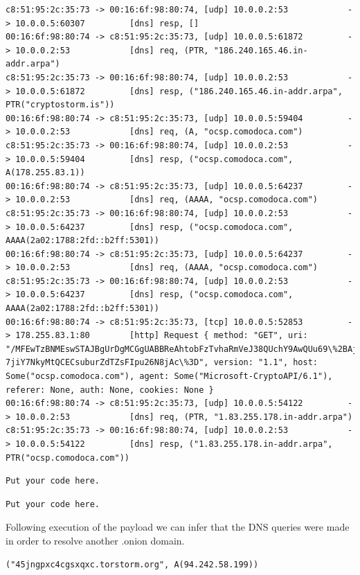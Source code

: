 \documentclass[11pt]{diazessay} %
\begin{document}
\begin{lstlisting}
c8:51:95:2c:35:73 -> 00:16:6f:98:80:74, [udp] 10.0.0.2:53            -> 10.0.0.5:60307         [dns] resp, []
00:16:6f:98:80:74 -> c8:51:95:2c:35:73, [udp] 10.0.0.5:61872         -> 10.0.0.2:53            [dns] req, (PTR, "186.240.165.46.in-addr.arpa")
c8:51:95:2c:35:73 -> 00:16:6f:98:80:74, [udp] 10.0.0.2:53            -> 10.0.0.5:61872         [dns] resp, ("186.240.165.46.in-addr.arpa", PTR("cryptostorm.is"))
00:16:6f:98:80:74 -> c8:51:95:2c:35:73, [udp] 10.0.0.5:59404         -> 10.0.0.2:53            [dns] req, (A, "ocsp.comodoca.com")
c8:51:95:2c:35:73 -> 00:16:6f:98:80:74, [udp] 10.0.0.2:53            -> 10.0.0.5:59404         [dns] resp, ("ocsp.comodoca.com", A(178.255.83.1))
00:16:6f:98:80:74 -> c8:51:95:2c:35:73, [udp] 10.0.0.5:64237         -> 10.0.0.2:53            [dns] req, (AAAA, "ocsp.comodoca.com")
c8:51:95:2c:35:73 -> 00:16:6f:98:80:74, [udp] 10.0.0.2:53            -> 10.0.0.5:64237         [dns] resp, ("ocsp.comodoca.com", AAAA(2a02:1788:2fd::b2ff:5301))
00:16:6f:98:80:74 -> c8:51:95:2c:35:73, [udp] 10.0.0.5:64237         -> 10.0.0.2:53            [dns] req, (AAAA, "ocsp.comodoca.com")
c8:51:95:2c:35:73 -> 00:16:6f:98:80:74, [udp] 10.0.0.2:53            -> 10.0.0.5:64237         [dns] resp, ("ocsp.comodoca.com", AAAA(2a02:1788:2fd::b2ff:5301))
00:16:6f:98:80:74 -> c8:51:95:2c:35:73, [tcp] 10.0.0.5:52853         -> 178.255.83.1:80        [http] Request { method: "GET", uri: "/MFEwTzBNMEswSTAJBgUrDgMCGgUABBReAhtobFzTvhaRmVeJ38QUchY9AwQUu69\%2BAj36pvE8hI6t
7jiY7NkyMtQCECsuburZdTZsFIpu26N8jAc\%3D", version: "1.1", host: Some("ocsp.comodoca.com"), agent: Some("Microsoft-CryptoAPI/6.1"), referer: None, auth: None, cookies: None }
00:16:6f:98:80:74 -> c8:51:95:2c:35:73, [udp] 10.0.0.5:54122         -> 10.0.0.2:53            [dns] req, (PTR, "1.83.255.178.in-addr.arpa")
c8:51:95:2c:35:73 -> 00:16:6f:98:80:74, [udp] 10.0.0.2:53            -> 10.0.0.5:54122         [dns] resp, ("1.83.255.178.in-addr.arpa", PTR("ocsp.comodoca.com"))
\end{lstlisting}
\begin{lstlisting}
Put your code here.
\end{lstlisting}
\begin{lstlisting}
Put your code here.
\end{lstlisting}

Following execution of the payload we can infer that the DNS queries were made in order to resolve another .onion domain.

\begin{lstlisting}
("45jngpxc4cgsxqxc.torstorm.org", A(94.242.58.199))
\end{lstlisting}
\end{document}

